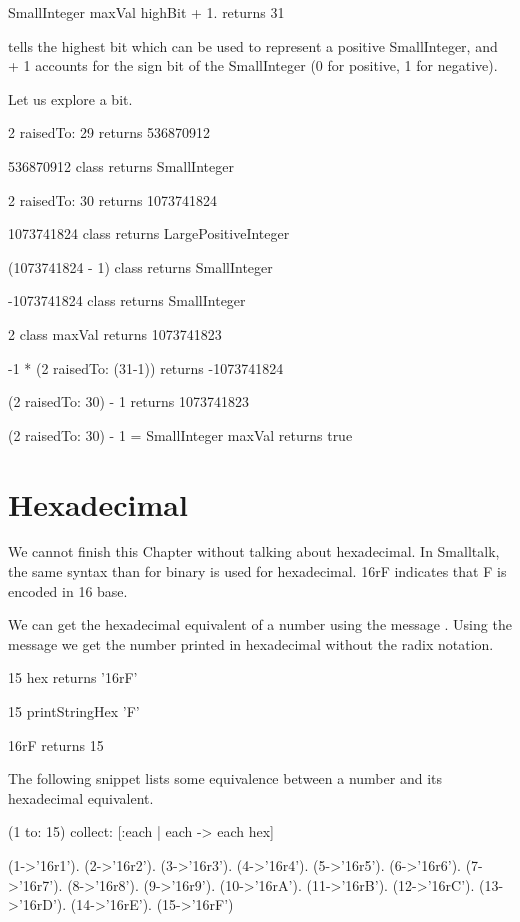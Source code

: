 \documentclass[a4paper,10pt,twoside]{book}
\begin{document}
\begin{code}
SmallInteger maxVal highBit + 1.
	returns 31
\end{code}

 tells the highest bit which can be used to
represent a positive SmallInteger, and + 1 accounts for the sign bit
of the SmallInteger (0 for positive, 1 for negative).


Let us explore a bit. 

\begin{code}{}
2 raisedTo: 29 
	returns 536870912 

536870912 class
	returns SmallInteger

2 raisedTo: 30 
	returns 1073741824

1073741824 class
	returns LargePositiveInteger
	
(1073741824 - 1) class
	returns SmallInteger

-1073741824 class 
	returns SmallInteger

2 class maxVal 
	returns 1073741823

-1 * (2 raisedTo: (31-1)) 
	returns -1073741824
	
(2 raisedTo: 30) - 1
	returns 1073741823
	
(2 raisedTo: 30) - 1 = SmallInteger maxVal	
	returns true
\end{code}

\section{Hexadecimal}
We cannot finish this Chapter without talking about hexadecimal. In Smalltalk, the same syntax than for binary is used for hexadecimal. 16rF indicates that F is encoded in 16 base. 

We can get the hexadecimal equivalent of a number using the message . 
Using the message  we get the number printed in hexadecimal without the radix notation. 

\begin{code}
15 hex
	returns '16rF'
	
15 printStringHex 'F'

16rF
	returns 15
\end{code}

The following snippet lists some equivalence between a number and its hexadecimal equivalent.
\begin{code}
(1 to: 15) collect: [:each | each -> each hex] 

{(1->'16r1'). (2->'16r2'). (3->'16r3'). (4->'16r4'). (5->'16r5'). (6->'16r6'). (7->'16r7'). (8->'16r8'). (9->'16r9'). (10->'16rA'). (11->'16rB'). (12->'16rC'). (13->'16rD'). (14->'16rE'). (15->'16rF')}
\end{code}
\end{document}
